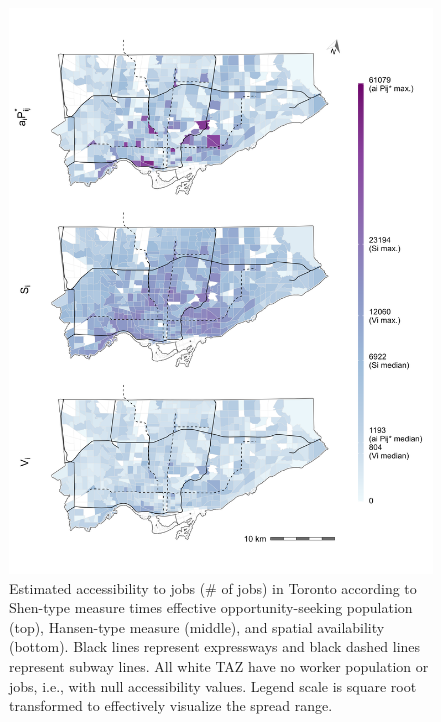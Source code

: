 \documentclass[10pt,letterpaper]{article}
\begin{document}
\begin{figure}
\includegraphics[width=1\linewidth]{images/access-job-Toronto-plot} \caption{\label{fig:absolute-accessibility-plot}Estimated accessibility to jobs (\# of jobs) in Toronto according to Shen-type measure times effective opportunity-seeking population (top), Hansen-type measure (middle), and spatial availability (bottom). Black lines represent expressways and black dashed lines represent subway lines. All white TAZ have no worker population or jobs, i.e., with null accessibility values. Legend scale is square root transformed to effectively visualize the spread range.}\label{fig:absolute-accessibility-plot}
\end{figure}
\end{document}

